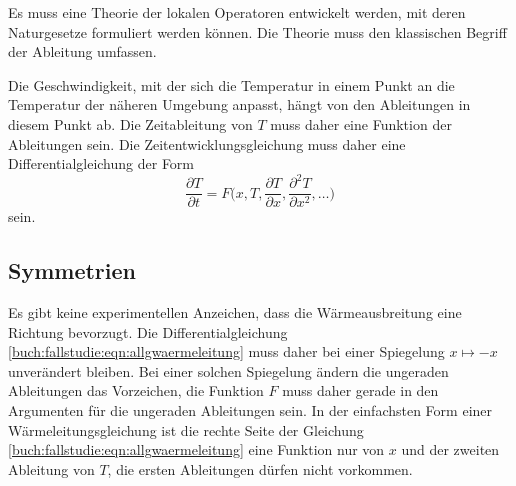 \begin{aufgabe}
Es muss eine Theorie der lokalen Operatoren entwickelt werden, mit deren
Naturgesetze formuliert werden können.
Die Theorie muss den klassischen Begriff der Ableitung umfassen.
\end{aufgabe}

Die Geschwindigkeit, mit der sich die Temperatur in einem Punkt
an die Temperatur der näheren Umgebung anpasst, hängt von den
Ableitungen in diesem Punkt ab.
Die Zeitableitung von $T$ muss daher eine Funktion der Ableitungen
sein.
Die Zeitentwicklungsgleichung muss daher eine Differentialgleichung
der Form
\begin{equation}
\frac{\partial T}{\partial t}
=
F\biggl(x,
T,
\frac{\partial T}{\partial x},
\frac{\partial^2 T}{\partial x^2},
\dots
\biggr)
\label{buch:fallstudie:eqn:allgwaermeleitung}
\end{equation}
sein.

\subsection{Symmetrien}
Es gibt keine experimentellen Anzeichen, dass die Wärmeausbreitung
eine Richtung bevorzugt.
Die Differentialgleichung
\eqref{buch:fallstudie:eqn:allgwaermeleitung}
muss daher bei einer Spiegelung $x\mapsto -x$ unverändert bleiben.
Bei einer solchen Spiegelung ändern die ungeraden Ableitungen
das Vorzeichen, die Funktion $F$ muss daher gerade in den Argumenten
für die ungeraden Ableitungen sein.
In der einfachsten Form einer Wärmeleitungsgleichung ist die rechte
Seite der Gleichung \eqref{buch:fallstudie:eqn:allgwaermeleitung}
eine Funktion nur von $x$ und der zweiten Ableitung von $T$, die
ersten Ableitungen dürfen nicht vorkommen.

